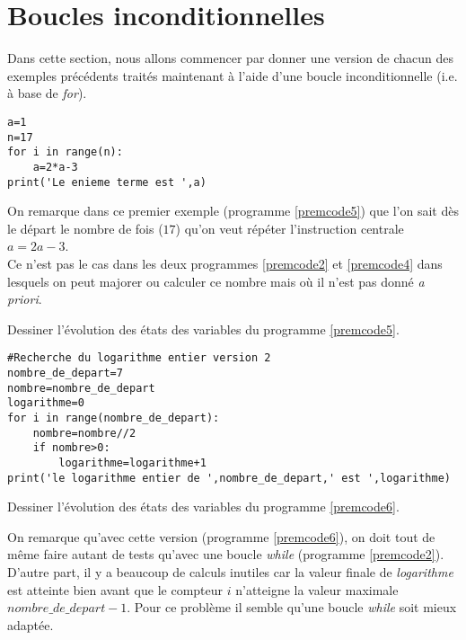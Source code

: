 \section{Boucles inconditionnelles}
Dans cette section, nous allons commencer par donner une version de chacun des exemples précédents traités maintenant à l'aide d'une boucle inconditionnelle (i.e. à base de \textit{for}).


\begin{lstlisting}[frame=lines, float=ht,caption={calcul du enieme terme d'une suite recurrente version \textit{for}},label=premcode5]
a=1
n=17
for i in range(n):
	a=2*a-3
print('Le enieme terme est ',a)  
\end{lstlisting}




On remarque dans ce premier exemple (programme \ref{premcode5}) que l'on sait dès le départ le nombre de fois ($17$) qu'on veut répéter l'instruction centrale $a=2a-3$.\\
Ce n'est pas le cas dans les deux programmes \ref{premcode2} et \ref{premcode4} dans lesquels on peut majorer ou calculer ce nombre mais où il n'est pas donné \textit{a priori}.

\begin{Exercise}[title={Evolution},counter={exo}]
  Dessiner l'évolution des états des variables du programme \ref{premcode5}.
\end{Exercise}

\begin{lstlisting}[frame=lines, float=ht,caption={logarithme V2 \textit{for}},label=premcode6]
#Recherche du logarithme entier version 2 
nombre_de_depart=7
nombre=nombre_de_depart
logarithme=0
for i in range(nombre_de_depart):
    nombre=nombre//2
    if nombre>0:
        logarithme=logarithme+1   
print('le logarithme entier de ',nombre_de_depart,' est ',logarithme)
\end{lstlisting}


\begin{Exercise}[title={Evolution},counter={exo}]
  Dessiner l'évolution des états des variables du programme \ref{premcode6}.
\end{Exercise}

On remarque qu'avec cette version (programme \ref{premcode6}), on doit tout de même faire autant de tests qu'avec une boucle \textit{while} (programme \ref{premcode2}).
D'autre part, il y a beaucoup de calculs inutiles car la valeur finale de \textit{logarithme} est atteinte bien avant que le compteur $i$ n'atteigne la valeur maximale $nombre\_de\_depart-1$. Pour ce problème il semble qu'une boucle \textit{while} soit mieux adaptée.

